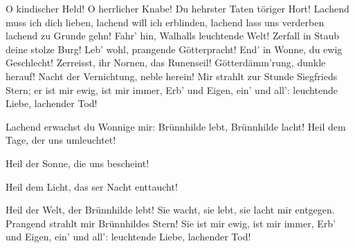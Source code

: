 \begin{drama}

\Brunnhildespeaks


O kindischer Held!
O herrlicher Knabe!
Du hehrster Taten
töriger Hort!
Lachend muss ich dich lieben,
lachend will ich erblinden,
lachend lass uns verderben
lachend zu Grunde gehn!
Fahr' hin, Walhalls
leuchtende Welt!
Zerfall in Staub
deine stolze Burg!
Leb' wohl, prangende
Götterpracht!
End' in Wonne,
du ewig Geschlecht!
Zerreisst, ihr Nornen,
das Runenseil!
Götterdämm'rung,
dunkle herauf!
Nacht der Vernichtung,
neble herein!
Mir strahlt zur Stunde
Siegfrieds Stern;
er ist mir ewig,
ist mir immer,
Erb' und Eigen,
ein' und all':
leuchtende Liebe,
lachender Tod!

\Siegfriedspeaks

Lachend erwachst
du Wonnige mir:
Brünnhilde lebt,
Brünnhilde lacht!
Heil dem Tage,
der uns umleuchtet!

Heil der Sonne,
die uns bescheint!

Heil dem Licht,
das ser Nacht enttaucht!

Heil der Welt,
der Brünnhilde lebt!
Sie wacht, sie lebt,
sie lacht mir entgegen.
Prangend strahlt
mir Brünnhildes Stern!
Sie ist mir ewig,
ist mir immer,
Erb' und Eigen,
ein' und all':
leuchtende Liebe,
lachender Tod!
\end{drama}
